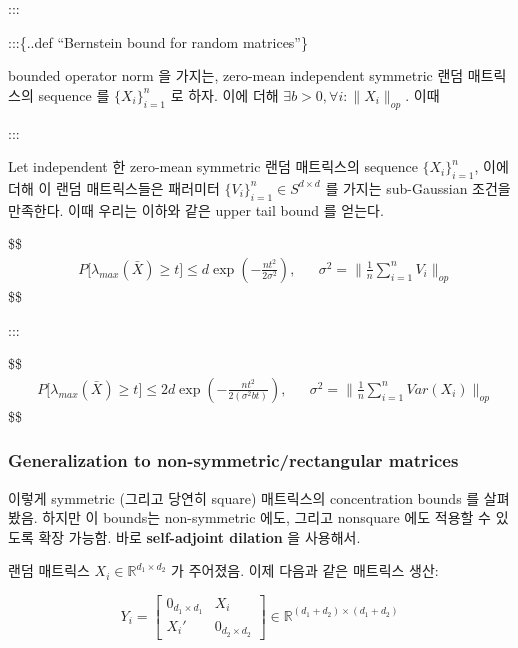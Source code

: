 \documentclass[
]{book}
\begin{document}
{{{:::

:::\{..def ``Bernstein bound for random matrices''\}

bounded operator norm 을 가지는, zero-mean independent symmetric 랜덤 매트릭스의 sequence 를 \(\{ X_i \}^n_{i=1}\) 로 하자. 이에 더해 \(\exists b>0, \forall i : \| X_i \|_{op}\). 이때

:::

Let independent 한 zero-mean symmetric 랜덤 매트릭스의 sequence \(\{ X_i \}^n_{i=1}\), 이에 더해 이 랜덤 매트릭스들은 패러미터 \(\{ V_i \}^n_{i=1} \in S^{d \times d}\) 를 가지는 sub-Gaussian 조건을 만족한다. 이때 우리는 이하와 같은 upper tail bound 를 얻는다.

\$\$
\begin{align}
&P \Big [ \lambda_{max}(\bar X) \ge t \Big ] \le d \exp \left( - \frac{nt^2}{2\sigma^2}\right), &&\sigma^2 = 

\textstyle

\| \tfrac{1}{n} \sum_{i=1}^n V_i \|_{op}
\end{align}
\$\$

:::

\$\$
\begin{align}
&P \Big [ \lambda_{max}(\bar X) \ge t \Big ] \le 2d \exp \left( - \frac{nt^2}{2(\sigma^2  bt)}\right), &&\sigma^2 = 

\textstyle

\| \tfrac{1}{n} \sum_{i=1}^n Var(X_i) \|_{op}
\end{align}
\$\$

\hypertarget{generalization-to-non-symmetricrectangular-matrices}{%
\subsubsection{Generalization to non-symmetric/rectangular matrices}\label{generalization-to-non-symmetricrectangular-matrices}}

이렇게 symmetric (그리고 당연히 square) 매트릭스의 concentration bounds 를 살펴봤음. 하지만 이 bounds는 non-symmetric 에도, 그리고 nonsquare 에도 적용할 수 있도록 확장 가능함. 바로 \textbf{self-adjoint dilation} 을 사용해서.

랜덤 매트릭스 \(X_i \in \mathbb R^{d_1 \times d_2}\) 가 주어졌음. 이제 다음과 같은 매트릭스 생산:

\[
Y_i = \begin{bmatrix} 0_{d_1 \times d_1} & X_i \\ X_i ' & 0_{d_2 \times d_2}\end{bmatrix} \in \mathbb R^{(d_1 + d_2) \times (d_1 + d_2)}
\]

}}}
\end{document}
